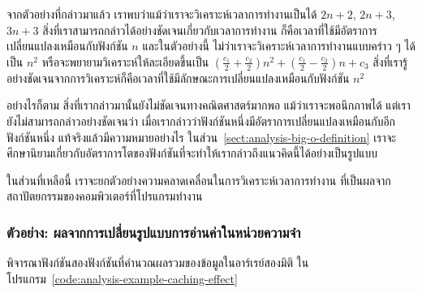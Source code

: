 จาก{\wbr}ตัวอย่าง{\wbr}ที่{\wbr}กล่าว{\wbr}มา{\wbr}แล้ว เรา{\wbr}พบ{\wbr}ว่า{\wbr}แม้ว่า{\wbr}เรา{\wbr}จะ{\wbr}วิเคราะห์{\wbr}เวลา{\wbr}การ{\wbr}ทำงาน{\wbr}เป็น{\wbr}ได้ $2n+2$,
$2n+3$, $3n+3$ สิ่ง{\wbr}ที่{\wbr}เรา{\wbr}สามารถ{\wbr}กล่าว{\wbr}ได้{\wbr}อย่าง{\wbr}ชัดเจน{\wbr}เกี่ยวกับ{\wbr}เวลา{\wbr}การ{\wbr}ทำงาน{\wbr}
ก็{\wbr}คือ{\wbr}เวลา{\wbr}ที่{\wbr}ใช้{\wbr}มี{\wbr}อัตรา{\wbr}การ{\wbr}เปลี่ยนแปลง{\wbr}เหมือน{\wbr}กับ{\wbr}ฟังก์ชัน $n$ และ{\wbr}ใน{\wbr}ตัวอย่าง{\wbr}นี้{\wbr}
ไม่ว่า{\wbr}เรา{\wbr}จะ{\wbr}วิเคราะห์{\wbr}เวลา{\wbr}การ{\wbr}ทำงาน{\wbr}แบบ{\wbr}คร่าว ๆ ได้{\wbr}เป็น $n^2$
หรือ{\wbr}จะ{\wbr}พยายาม{\wbr}วิเคราะห์{\wbr}ให้{\wbr}ละเอียด{\wbr}ขึ้น{\wbr}เป็น $\left(\frac{c_1}{2} +
\frac{c_2}{2}\right)n^2 + \left(\frac{c_1}{2} - \frac{c_2}{2}\right)n
+ c_3$
สิ่ง{\wbr}ที่{\wbr}เรา{\wbr}รู้{\wbr}อย่าง{\wbr}ชัดเจน{\wbr}จาก{\wbr}การ{\wbr}วิเคราะห์{\wbr}ก็{\wbr}คือ{\wbr}เวลา{\wbr}ที่{\wbr}ใช้{\wbr}มี{\wbr}ลักษณะ{\wbr}การ{\wbr}เปลี่ยนแปลง{\wbr}เหมือน{\wbr}กับ{\wbr}ฟังก์ชัน{\wbr}
$n^2$

อย่างไรก็ตาม สิ่ง{\wbr}ที่{\wbr}เรา{\wbr}กล่าว{\wbr}มา{\wbr}นั้น{\wbr}ยัง{\wbr}ไม่{\wbr}ชัดเจน{\wbr}ทาง{\wbr}คณิตศาสตร์{\wbr}มาก{\wbr}พอ แม้ว่า{\wbr}เรา{\wbr}จะ{\wbr}พอ{\wbr}นึก{\wbr}ภาพ{\wbr}ได้{\wbr}
แต่{\wbr}เรา{\wbr}ยัง{\wbr}ไม่{\wbr}สามารถ{\wbr}กล่าว{\wbr}อย่าง{\wbr}ชัดเจน{\wbr}ว่า{\wbr}
เมื่อ{\wbr}เรา{\wbr}กล่าว{\wbr}ว่า{\wbr}ฟังก์ชัน{\wbr}หนึ่ง{\wbr}มี{\wbr}อัตรา{\wbr}การ{\wbr}เปลี่ยนแปลง{\wbr}เหมือน{\wbr}กับ{\wbr}อีก{\wbr}ฟังก์ชัน{\wbr}หนึ่ง{\wbr}
แท้จริง{\wbr}แล้ว{\wbr}มี{\wbr}ความหมาย{\wbr}อย่างไร ใน{\wbr}ส่วน~\ref{sect:analysis-big-o-definition}
เรา{\wbr}จะ{\wbr}ศึกษา{\wbr}นิยาม{\wbr}เกี่ยวกับ{\wbr}อัตรา{\wbr}การ{\wbr}โต{\wbr}ของ{\wbr}ฟังก์ชัน{\wbr}ที่{\wbr}จะ{\wbr}ทำ{\wbr}ให้{\wbr}เรา{\wbr}กล่าว{\wbr}ถึง{\wbr}แนว{\wbr}คิด{\wbr}นี้{\wbr}ได้{\wbr}อย่าง{\wbr}เป็น{\wbr}รูปแบบ{\wbr}

ใน{\wbr}ส่วน{\wbr}ที่{\wbr}เหลือ{\wbr}นี้ เรา{\wbr}จะ{\wbr}ยก{\wbr}ตัวอย่าง{\wbr}ความ{\wbr}คลาดเคลื่อน{\wbr}ใน{\wbr}การ{\wbr}วิเคราะห์{\wbr}เวลา{\wbr}การ{\wbr}ทำงาน{\wbr}
ที่{\wbr}เป็น{\wbr}ผล{\wbr}จาก{\wbr}สถาปัตยกรรม{\wbr}ของ{\wbr}คอมพิวเตอร์{\wbr}ที่{\wbr}โปรแกรม{\wbr}ทำงาน{\wbr}

\subsubsection{ตัวอย่าง: ผล{\wbr}จาก{\wbr}การ{\wbr}เปลี่ยน{\wbr}รูปแบบ{\wbr}การ{\wbr}อ่าน{\wbr}ค่า{\wbr}ใน{\wbr}หน่วยความจำ}

พิจารณา{\wbr}ฟังก์ชัน{\wbr}สอง{\wbr}ฟังก์ชัน{\wbr}ที่{\wbr}คำนวณ{\wbr}ผลรวม{\wbr}ของ{\wbr}ข้อมูล{\wbr}ใน{\wbr}อาร์เรย์{\wbr}สอง{\wbr}มิติ{\wbr}
ใน{\wbr}โปรแกรม~\ref{code:analysis-example-caching-effect}

